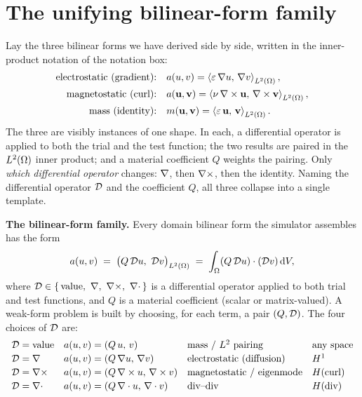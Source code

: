\section{The unifying bilinear-form family}
\label{sec:family}

Lay the three bilinear forms we have derived side by side, written in the
inner-product notation of the notation box:
\begin{align*}
  \text{electrostatic (gradient):}\quad & a(u,v) = \left\langle \varepsilon\,\nabla u,\, \nabla v\right\rangle_{L^2(\Omega)},\\
  \text{magnetostatic (curl):}\quad & a(\mathbf{u},\mathbf{v}) = \left\langle \nu\,\nabla\times\mathbf{u},\, \nabla\times\mathbf{v}\right\rangle_{L^2(\Omega)},\\
  \text{mass (identity):}\quad & m(\mathbf{u},\mathbf{v}) = \left\langle \varepsilon\,\mathbf{u},\, \mathbf{v}\right\rangle_{L^2(\Omega)}.
\end{align*}
The three are visibly instances of one shape. In each, a differential operator
is applied to both the trial and the test function; the two results are paired in
the $L^2(\Omega)$ inner product; and a material coefficient $Q$ weights the
pairing. Only \emph{which differential operator} changes: $\nabla$, then $\nabla\times$,
then the identity. Naming the differential operator $\mathcal{D}$ and the coefficient
$Q$, all three collapse into a single template.

\begin{keyidea}
\textbf{The bilinear-form family.}
Every domain bilinear form the simulator assembles has the form
\begin{equation}
  a(u,v) \;=\; \bigl(Q\,\mathcal{D} u,\ \mathcal{D} v\bigr)_{L^2(\Omega)}
            \;=\; \int_\Omega (Q\,\mathcal{D} u)\cdot(\mathcal{D} v)\,\mathrm{d}V,
  \label{eq:family}
\end{equation}
where $\diffop\in\{\,\text{value},\ \Grad,\ \Curl,\ \Div\,\}$ is a differential
operator applied to both trial and test functions, and $Q$ is a material
coefficient (scalar or matrix-valued). A weak-form problem is built by choosing,
for each term, a pair $(Q,\mathcal{D})$. The four choices of $\mathcal{D}$ are:
\[
\begin{array}{llll}
  \mathcal{D}=\text{value} & a(u,v)=(Q\,u,\,v) & \text{mass / }L^2\text{ pairing} & \text{any space}\\[2pt]
  \mathcal{D}=\nabla        & a(u,v)=(Q\,\nabla u,\,\nabla v) & \text{electrostatic (diffusion)} & H^1\\[2pt]
  \mathcal{D}=\nabla\times        & a(u,v)=(Q\,\nabla\times u,\,\nabla\times v) & \text{magnetostatic / eigenmode} & H(\mathrm{curl})\\[2pt]
  \mathcal{D}=\nabla\cdot         & a(u,v)=(Q\,\nabla\cdot u,\,\nabla\cdot v) & \text{div--div} & H(\mathrm{div})
\end{array}
\]
\end{keyidea}

